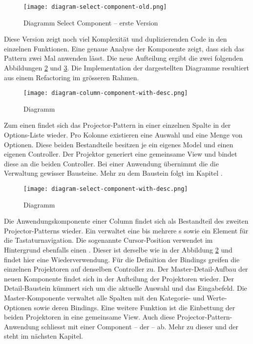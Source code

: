 \begin{figure}[!htb]
    \centering
    \texttt{[image: diagram-select-component-old.png]}
    \caption{\centering Diagramm Select Component – erste Version}
    \label{img:diagramSelectComponentOld}
\end{figure}

Diese Version zeigt noch viel Komplexität und duplizierenden Code in den einzelnen Funktionen. 
Eine genaue Analyse der Komponente zeigt, dass sich das Pattern zwei Mal anwenden lässt. 
Die neue Aufteilung ergibt die zwei folgenden Abbildungen \ref{img:diagramColumnComponent} und \ref{img:diagramSelectComponent}. 
Die Implementation der dargestellten Diagramme resultiert aus einem Refactoring im grösseren Rahmen. 

\begin{figure}[!htb]
    \centering
    \texttt{[image: diagram-column-component-with-desc.png]}
    \caption{\centering Diagramm }
    \label{img:diagramColumnComponent}
\end{figure}

Zum einen findet sich das Projector-Pattern in einer einzelnen Spalte in der Options-Liste wieder. 
Pro Kolonne existieren eine Auswahl und eine Menge von Optionen. 
Diese beiden Bestandteile besitzen je ein eigenes Model und einen eigenen Controller. 
Der Projektor generiert eine gemeinsame View und bindet diese an die beiden Controller. 
Bei einer Anwendung übernimmt die  die Verwaltung gewisser Bausteine. 
Mehr zu dem Baustein folgt im Kapitel \textbf{}. 

\begin{figure}[!htb]
    \centering
    \texttt{[image: diagram-select-component-with-desc.png]}
    \caption{\centering Diagramm }
    \label{img:diagramSelectComponent}
\end{figure}

Die Anwendungskomponente einer Column findet sich als Bestandteil des zweiten Projector-Patterns wieder. 
Ein  verwaltet eine bis mehrere s sowie ein Element für die Tastaturnavigation. 
Die sogenannte Cursor-Position verwendet im Hintergrund ebenfalls einen . 
Dieser ist derselbe wie in der Abbildung \ref{img:diagramColumnComponent} und findet hier eine Wiederverwendung. 
Für die Definition der Bindings greifen die einzelnen Projektoren auf denselben Controller zu. 
Der Master-Detail-Aufbau der neuen Komponente findet sich in der Aufteilung der Projektoren wieder. 
Der Detail-Baustein kümmert sich um die aktuelle Auswahl und das Eingabefeld. 
Die Master-Komponente verwaltet alle Spalten mit den Kategorie- und Werte-Optionen sowie deren Bindings. 
Eine weitere Funktion ist die Einbettung der beiden Projektoren in eine gemeinsame View. 
Auch diese Projector-Pattern-Anwendung schliesst mit einer Component – der  – ab. 
Mehr zu dieser und der  steht im nächsten Kapitel. 


